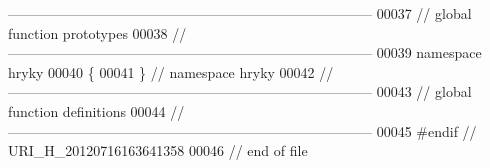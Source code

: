 \begin{DoxyCode}
{      ------------------------------------------------------------------------------}
00037 \textcolor{comment}{// global function prototypes}
00038 \textcolor{comment}{//
      ------------------------------------------------------------------------------}
00039 \textcolor{keyword}{namespace }hryky
00040 \{
00041 \} \textcolor{comment}{// namespace hryky}
00042 \textcolor{comment}{//
      ------------------------------------------------------------------------------}
00043 \textcolor{comment}{// global function definitions}
00044 \textcolor{comment}{//
      ------------------------------------------------------------------------------}
00045 \textcolor{preprocessor}{#endif // URI\_H\_20120716163641358}
00046 \textcolor{preprocessor}{}\textcolor{comment}{// end of file}
\end{DoxyCode}
